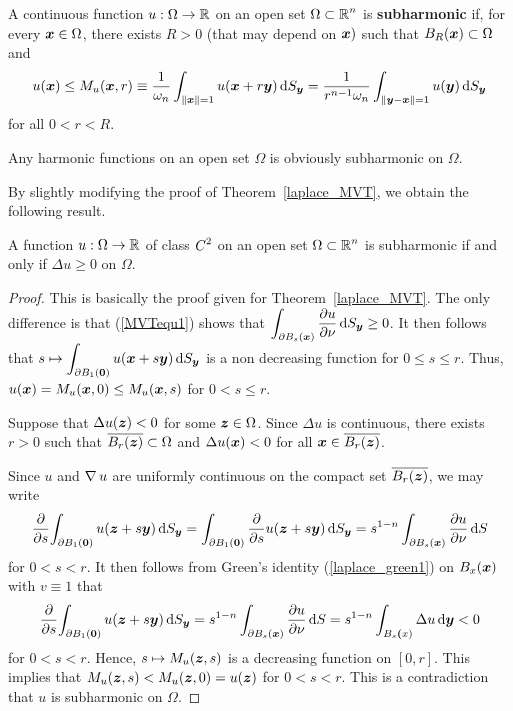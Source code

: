 \begin{defn}
A continuous function $u:\Omega \to \RR$ on an open set
$\DS \Omega \subset \RR^n$ is
{\bfseries subharmonic}
if, for every $\VEC{x} \in \Omega$, there exists $R>0$ (that may depend
on $\VEC{x})$ such that $B_R(\VEC{x}) \subset \Omega$ and
\[
u(\VEC{x}) \leq M_u(\VEC{x},r) \equiv \frac{1}{\omega_n}
\int_{\|\VEC{x}\|=1} u(\VEC{x} + r\VEC{y}) \dss{S}{y}
= \frac{1}{r^{n-1}\omega_n} \int_{\|\VEC{y}-\VEC{x}\|=1} u(\VEC{y}) \dss{S}{y}
\]
for all $0<r<R$.
\end{defn}

Any harmonic functions on an open set $\Omega$ is obviously
subharmonic on $\Omega$.

By slightly modifying the proof of Theorem~\ref{laplace_MVT}, we
obtain the following result.

\begin{prop}
A function $u:\Omega \to \RR$ of class $\DS C^2$ on an open set
$\DS \Omega \subset \RR^n$ is subharmonic if and only if
$\Delta u \geq 0$ on $\Omega$.
\end{prop}

\begin{proof}
\stage{$\mathbf{\Leftarrow}$}  This is basically the proof given for
Theorem~\ref{laplace_MVT}.  The only difference is that
(\ref{MVTequ1}) shows that $\DS \int_{\partial B_s(\VEC{x})}
\pdydx{u}{\nu} \dss{S}{y} \geq 0$.
It then follows that
$\DS s \mapsto
\int_{\partial B_1(\VEC{0})} u(\VEC{x} + s\VEC{y}) \dss{S}{y}$
is a non decreasing function for $0 \leq s \leq r$.  Thus,
$u(\VEC{x}) = M_u(\VEC{x},0) \leq M_u(\VEC{x},s)$ for $0 < s \leq r$.

\stage{$\mathbf{\Rightarrow}$}
Suppose that $\Delta u(\VEC{z}) < 0$ for some $\VEC{z} \in \Omega$.
Since $\Delta u$ is continuous, there exists $r>0$ such that
$\DS \overline{B_r(\VEC{z})} \subset \Omega$ and
$\Delta u(\VEC{x}) < 0 $ for all
$\DS \VEC{x} \in \overline{B_r(\VEC{z})}$.

Since $u$ and $\graD u$ are uniformly continuous on the compact set
$\DS \overline{B_r(\VEC{z})}$, we may write
\[
\pdfdx{ \int_{\partial B_1(\VEC{0})} u(\VEC{z} + s\VEC{y}) \dss{S}{y} }{s}
= \int_{\partial B_1(\VEC{0})} \pdfdx{ u(\VEC{z} + s\VEC{y})}{s} \dss{S}{y}
= s^{1-n} \int_{\partial B_s(\VEC{x})} \pdydx{u}{\nu} \dx{S}
\]
for $0 < s < r$.
It then follows from Green's identity (\ref{laplace_green1}) on
$B_x(\VEC{x})$ with $v \equiv 1$ that
\[
\pdfdx{ \int_{\partial B_1(\VEC{0})} u(\VEC{z} + s\VEC{y}) \dss{S}{y} }{s}
= s^{1-n} \int_{\partial B_s(\VEC{x})} \pdydx{u}{\nu} \dx{S}
= s^{1-n} \int_{B_s{\VEC(x)}} \Delta u \dx{\VEC{y}} < 0
\]
for $0 < s < r$.  Hence, $s \mapsto M_u(\VEC{z},s)$ is a decreasing
function on $[0,r]$.  This implies that
$M_u(\VEC{z},s) < M_u(\VEC{z},0) = u(\VEC{z})$
for $0<s<r$.  This is a contradiction that $u$ is subharmonic on $\Omega$.
\end{proof}

